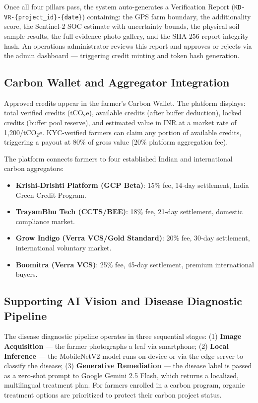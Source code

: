 \documentclass[10pt,a4paper]{article}
\begin{document}
Once all four pillars pass, the system auto-generates a Verification Report (\texttt{KD-VR-\{project\_id\}-\{date\}}) containing: the GPS farm boundary, the additionality score, the Sentinel-2 SOC estimate with uncertainty bounds, the physical soil sample results, the full evidence photo gallery, and the SHA-256 report integrity hash. An operations administrator reviews this report and approves or rejects via the admin dashboard — triggering credit minting and token hash generation.

\subsection{Carbon Wallet and Aggregator Integration}
Approved credits appear in the farmer's Carbon Wallet. The platform displays: total verified credits (tCO$_2$e), available credits (after buffer deduction), locked credits (buffer pool reserve), and estimated value in INR at a market rate of \rupee{}1,200/tCO$_2$e. KYC-verified farmers can claim any portion of available credits, triggering a payout at 80\% of gross value (20\% platform aggregation fee).

The platform connects farmers to four established Indian and international carbon aggregators:
\begin{itemize}
    \item \textbf{Krishi-Drishti Platform (GCP Beta)}: 15\% fee, 14-day settlement, India Green Credit Program.
    \item \textbf{TrayamBhu Tech (CCTS/BEE)}: 18\% fee, 21-day settlement, domestic compliance market.
    \item \textbf{Grow Indigo (Verra VCS/Gold Standard)}: 20\% fee, 30-day settlement, international voluntary market.
    \item \textbf{Boomitra (Verra VCS)}: 25\% fee, 45-day settlement, premium international buyers.
\end{itemize}

\subsection{Supporting AI Vision and Disease Diagnostic Pipeline}
The disease diagnostic pipeline operates in three sequential stages: (1) \textbf{Image Acquisition} — the farmer photographs a leaf via smartphone; (2) \textbf{Local Inference} — the MobileNetV2 model runs on-device or via the edge server to classify the disease; (3) \textbf{Generative Remediation} — the disease label is passed as a zero-shot prompt to Google Gemini 2.5 Flash, which returns a localized, multilingual treatment plan. For farmers enrolled in a carbon program, organic treatment options are prioritized to protect their carbon project status.
\end{document}
